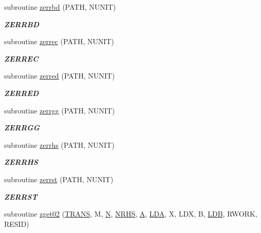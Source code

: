 \begin{DoxyCompactItemize}
subroutine \hyperlink{group__complex16__eig_ga5d4eaa3add8cbf75ae58c21d83fa54a9}{zerrbd} (P\+A\+T\+H, N\+U\+N\+I\+T)
\begin{DoxyCompactList}\small\item\em {\bfseries Z\+E\+R\+R\+B\+D} \end{DoxyCompactList}\item 
subroutine \hyperlink{group__complex16__eig_ga2ded12fae46c5460170f505ca65744a2}{zerrec} (P\+A\+T\+H, N\+U\+N\+I\+T)
\begin{DoxyCompactList}\small\item\em {\bfseries Z\+E\+R\+R\+E\+C} \end{DoxyCompactList}\item 
subroutine \hyperlink{group__complex16__eig_ga5e12931d109ad06c796b415722e71e52}{zerred} (P\+A\+T\+H, N\+U\+N\+I\+T)
\begin{DoxyCompactList}\small\item\em {\bfseries Z\+E\+R\+R\+E\+D} \end{DoxyCompactList}\item 
subroutine \hyperlink{group__complex16__eig_gabef96c9e9ff97dba730385e3b59a9b0f}{zerrgg} (P\+A\+T\+H, N\+U\+N\+I\+T)
\begin{DoxyCompactList}\small\item\em {\bfseries Z\+E\+R\+R\+G\+G} \end{DoxyCompactList}\item 
subroutine \hyperlink{group__complex16__eig_gac8d8895448cbc459ded47dd743f46699}{zerrhs} (P\+A\+T\+H, N\+U\+N\+I\+T)
\begin{DoxyCompactList}\small\item\em {\bfseries Z\+E\+R\+R\+H\+S} \end{DoxyCompactList}\item 
subroutine \hyperlink{group__complex16__eig_gaa43562d1ca14d490f6fb6ee555df7438}{zerrst} (P\+A\+T\+H, N\+U\+N\+I\+T)
\begin{DoxyCompactList}\small\item\em {\bfseries Z\+E\+R\+R\+S\+T} \end{DoxyCompactList}\item 
subroutine \hyperlink{group__complex16__eig_ga66d124fa093cbd4a9c70d869fae241fd}{zget02} (\hyperlink{superlu__enum__consts_8h_a0c4e17b2d5cea33f9991ccc6a6678d62a1f61e3015bfe0f0c2c3fda4c5a0cdf58}{T\+R\+A\+N\+S}, M, \hyperlink{polmisc_8c_a0240ac851181b84ac374872dc5434ee4}{N}, \hyperlink{example__user_8c_aa0138da002ce2a90360df2f521eb3198}{N\+R\+H\+S}, \hyperlink{classA}{A}, \hyperlink{example__user_8c_ae946da542ce0db94dced19b2ecefd1aa}{L\+D\+A}, X, L\+D\+X, B, \hyperlink{example__user_8c_a50e90a7104df172b5a89a06c47fcca04}{L\+D\+B}, R\+W\+O\+R\+K, R\+E\+S\+I\+D)

\end{DoxyCompactItemize}
